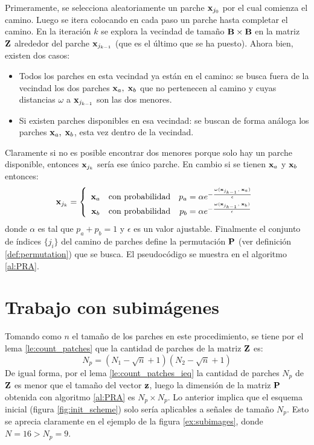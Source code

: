 Primeramente, se selecciona aleatoriamente un parche $\x_{j_0}$ por el cual comienza el camino. Luego se itera colocando en cada paso un parche hasta completar el camino. En la iteraci\'on $k$ se explora la vecindad de tamaño $\B \times \B$ en la matriz $\Z$ alrededor del parche $\x_{j_{k - 1}}$ (que es el \'ultimo que se ha puesto). Ahora bien, existen dos casos:
\begin{itemize}
\item Todos los parches en esta vecindad ya están en el camino: se busca fuera de la vecindad los dos parches $\x_a,\; \x_b$ que no pertenecen al camino y cuyas distancias $\omega$ a $\x_{j_{k - 1}}$ son las dos menores.
\item Si existen parches disponibles en esa vecindad: se buscan de forma an\'aloga los parches $\x_a,\; \x_b$, esta vez dentro de la vecindad.
\end{itemize}
Claramente si no es posible encontrar dos menores porque solo hay un parche disponible, entonces $\x_{j_k}$ ser\'ia ese \'unico parche. En cambio si se tienen $\x_a$ y $\x_b$ entonces:
\begin{equation}
	\x_{j_k} = \left\{
		\begin{array}{ccc}
		\x_a &\mbox{con probabilidad}& p_a = \alpha e^{-\frac{\omega(\x_{j_{k - 1}},\; \x_a)}{\epsilon}}\\
		\x_b &\mbox{con probabilidad}& p_b = \alpha e^{-\frac{\omega(\x_{j_{k - 1}},\; \x_b)}{\epsilon}}\\
		\end{array}
	\right.
	\label{eq:choosing_patch}
\end{equation}
donde $\alpha$ es tal que $p_a + p_b = 1$ y $\epsilon$ es un valor ajustable. Finalmente el conjunto de \'indices $\{j_i\}$ del camino de parches define la permutaci\'on $\P$ (ver definici\'on \ref{def:permutation}) que se busca. El pseudoc\'odigo se muestra en el algoritmo \ref{al:PRA}.

\section{Trabajo con subim\'agenes}
Tomando como $n$ el tamaño de los parches en este procedimiento, se tiene por el lema \ref{le:count_patches} que la cantidad de parches de la matriz $\Z$ es: 
\begin{equation}
	N_p = (N_1 - \sqrt{n} + 1)(N_2 - \sqrt{n} + 1)
	\label{eq:patches}
\end{equation}
De igual forma, por el lema \ref{le:count_patches_ieq} la cantidad de parches $N_p$ de $\Z$ es menor que el tamaño del vector $\z$, luego la dimensi\'on de la matriz $\P$ obtenida con algoritmo \ref{al:PRA} es $N_p \times N_p$. Lo anterior implica que el esquema inicial (figura \ref{fig:init_scheme}) solo ser\'ia aplicables a señales de tamaño $N_p$. Esto se aprecia claramente en el ejemplo de la figura \ref{ex:subimages}, donde $N = 16 > N_p = 9$.

